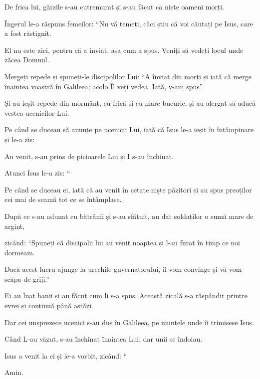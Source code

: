 {De frica lui, gărzile s-au cutremurat și s-au făcut ca niște oameni morți.

Îngerul le-a răspuns femeilor: “Nu vă temeți, căci știu că voi căutați pe Isus, care a fost răstignit.

El nu este aici, pentru că a înviat, așa cum a spus. Veniți să vedeți locul unde zăcea Domnul.

Mergeți repede și spuneți-le discipolilor Lui: “A înviat din morți și iată că merge înaintea voastră în Galileea; acolo Îl veți vedea. Iată, v-am spus”.


\par }{\PP {}Și au ieșit repede din mormânt, cu frică și cu mare bucurie, și au alergat să aducă vestea ucenicilor Lui.

Pe când se duceau să anunțe pe ucenicii Lui, iată că Isus le-a ieșit în întâmpinare și le-a zis:
{}

\par }{\PP Au venit, s-au prins de picioarele Lui și I s-au închinat.


\par }{\PP {}Atunci Isus le-a zis: “{}


\par }{\PP {}Pe când se duceau ei, iată că au venit în cetate niște păzitori și au spus preoților cei mai de seamă tot ce se întâmplase.

După ce s-au adunat cu bătrânii și s-au sfătuit, au dat soldaților o sumă mare de argint,

zicând: “Spuneți că discipolii lui au venit noaptea și l-au furat în timp ce noi dormeam.

Dacă acest lucru ajunge la urechile guvernatorului, îl vom convinge și vă vom scăpa de griji.”

Ei au luat banii și au făcut cum li s-a spus. Această zicală s-a răspândit printre evrei și continuă până astăzi.


\par }{\PP {}Dar cei unsprezece ucenici s-au dus în Galileea, pe muntele unde îi trimisese Isus.

Când L-au văzut, s-au închinat înaintea Lui; dar unii se îndoiau.

Isus a venit la ei și le-a vorbit, zicând: “{}


 Amin.


\par }